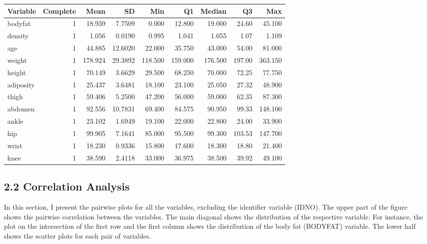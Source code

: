 \documentclass[
]{article}
\begin{document}
\begin{tabular}{l|r|r|r|r|r|r|r|r}
\hline
Variable & Complete & Mean & SD & Min & Q1 & Median & Q3 & Max\\
\hline
bodyfat & 1 & 18.939 & 7.7509 & 0.000 & 12.800 & 19.000 & 24.60 & 45.100\\
\hline
density & 1 & 1.056 & 0.0190 & 0.995 & 1.041 & 1.055 & 1.07 & 1.109\\
\hline
age & 1 & 44.885 & 12.6020 & 22.000 & 35.750 & 43.000 & 54.00 & 81.000\\
\hline
weight & 1 & 178.924 & 29.3892 & 118.500 & 159.000 & 176.500 & 197.00 & 363.150\\
\hline
height & 1 & 70.149 & 3.6629 & 29.500 & 68.250 & 70.000 & 72.25 & 77.750\\
\hline
adiposity & 1 & 25.437 & 3.6481 & 18.100 & 23.100 & 25.050 & 27.32 & 48.900\\
\hline
thigh & 1 & 59.406 & 5.2500 & 47.200 & 56.000 & 59.000 & 62.35 & 87.300\\
\hline
abdomen & 1 & 92.556 & 10.7831 & 69.400 & 84.575 & 90.950 & 99.33 & 148.100\\
\hline
ankle & 1 & 23.102 & 1.6949 & 19.100 & 22.000 & 22.800 & 24.00 & 33.900\\
\hline
hip & 1 & 99.905 & 7.1641 & 85.000 & 95.500 & 99.300 & 103.53 & 147.700\\
\hline
wrist & 1 & 18.230 & 0.9336 & 15.800 & 17.600 & 18.300 & 18.80 & 21.400\\
\hline
knee & 1 & 38.590 & 2.4118 & 33.000 & 36.975 & 38.500 & 39.92 & 49.100\\
\hline
\end{tabular}

\hypertarget{correlation-analysis}{%
\subsection{\texorpdfstring{\textbf{2.2 Correlation
Analysis}}{2.2 Correlation Analysis}}\label{correlation-analysis}}

In this section, I present the pairwise plots for all the variables,
excluding the identifier variable (IDNO). The upper part of the figure
shows the pairwise correlation between the variables. The main diagonal
shows the distribution of the respective variable. For instance, the
plot on the intersection of the first row and the first column shows the
distribution of the body fat (BODYFAT) variable. The lower half shows
the scatter plots for each pair of variables.
\end{document}
